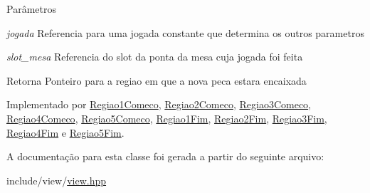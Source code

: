 \begin{DoxyParams}{Parâmetros}
\item[{\em jogada}]Referencia para uma jogada constante que determina os outros parametros \item[{\em slot\_\-mesa}]Referencia do slot da ponta da mesa cuja jogada foi feita \end{DoxyParams}
\begin{DoxyReturn}{Retorna}
Ponteiro para a regiao em que a nova peca estara encaixada 
\end{DoxyReturn}


Implementado por \hyperlink{classRegiao1Comeco_afc4135c2d9913c55d620241a3f780268}{Regiao1Comeco}, \hyperlink{classRegiao2Comeco_aef5c4a25b00a87f2805c69451fea103d}{Regiao2Comeco}, \hyperlink{classRegiao3Comeco_a6484c63613843819aac4f486ca8a5ac4}{Regiao3Comeco}, \hyperlink{classRegiao4Comeco_a81b413f8c719c5f10b60d2a046a8cebb}{Regiao4Comeco}, \hyperlink{classRegiao5Comeco_ab0e0ddb0608efdc462090ced3d8fdac0}{Regiao5Comeco}, \hyperlink{classRegiao1Fim_aa1a0145f9e03f4c934b4216dc06dae1b}{Regiao1Fim}, \hyperlink{classRegiao2Fim_a8aebf23ca0e1f36a3bfc15073e0b4485}{Regiao2Fim}, \hyperlink{classRegiao3Fim_acfbff7cf6d2848248d827efa6bf61663}{Regiao3Fim}, \hyperlink{classRegiao4Fim_a9292ee02c32056919d94d2b9d2c4edbb}{Regiao4Fim} e \hyperlink{classRegiao5Fim_a25df09bde149c0479f4c02264885299f}{Regiao5Fim}.



A documentação para esta classe foi gerada a partir do seguinte arquivo:\begin{DoxyCompactItemize}
\item 
include/view/\hyperlink{view_8hpp}{view.hpp}\end{DoxyCompactItemize}
